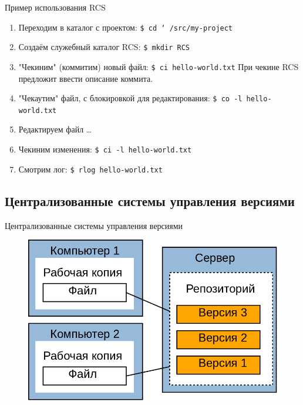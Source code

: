 \documentclass[presentation]{beamer}
\begin{document}

\begin{frame}[fragile]{Пример использования RCS}
  \begin{enumerate}
    \item Переходим в каталог с проектом: \newline
      \texttt{\$ cd \char`~/src/my-project}
    \item Создаём служебный каталог RCS: \newline
      \texttt{\$ mkdir RCS}
    \item "Чекиним" (коммитим) новый файл: \newline
      \texttt{\$ ci hello-world.txt}
      \newline
      При чекине RCS предложит ввести описание коммита.
    \item "Чекаутим" файл, с блокировкой для редактирования: \newline
      \texttt{\$ co -l hello-world.txt}
    \item Редактируем файл \ldots
    \item Чекиним изменения: \newline
      \texttt{\$ ci -l hello-world.txt}
    \item Смотрим лог: \newline
      \texttt{\$ rlog hello-world.txt}
  \end{enumerate}
\end{frame}



\subsection{Централизованные системы управления версиями}

\begin{frame}{Централизованные системы управления версиями}
  \begin{figure}[htb]
    \centering \includegraphics[width=1.0\textwidth]{vcs-centralized}
  \end{figure}
\end{frame}
\end{document}
